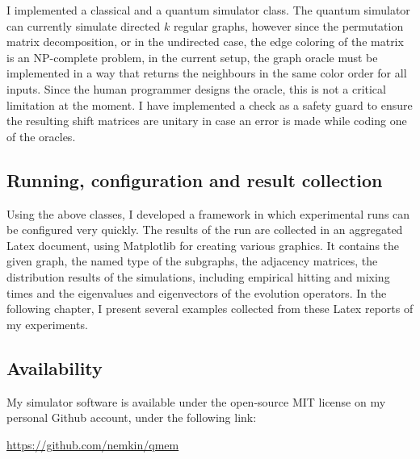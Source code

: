 I implemented a classical and a quantum simulator class. The quantum simulator can currently simulate directed $k$ regular graphs, however since the permutation matrix decomposition, or in the undirected case, the edge coloring of the matrix is an NP-complete problem, in the current setup, the graph oracle must be implemented in a way that returns the neighbours in the same color order for all inputs. Since the human programmer designs the oracle, this is not a critical limitation at the moment. I have implemented a check as a safety guard to ensure the resulting shift matrices are unitary in case an error is made while coding one of the oracles.

\subsection{Running, configuration and result collection}

Using the above classes, I developed a framework in which experimental runs can be configured very quickly. The results of the run are collected in an aggregated Latex document, using Matplotlib for creating various graphics. It contains the given graph, the named type of the subgraphs, the adjacency matrices, the distribution results of the simulations, including empirical hitting and mixing times and the eigenvalues and eigenvectors of the evolution operators. In the following chapter, I present several examples collected from these Latex reports of my experiments.

\subsection{Availability}

My simulator software is available under the open-source MIT license on my personal Github account, under the following link:

\url{https://github.com/nemkin/qmem}
